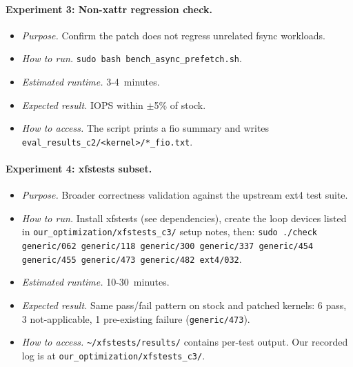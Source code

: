 \documentclass[11pt,a4paper]{article}
\begin{document}
\paragraph{Experiment 3: Non-xattr regression check.}
\begin{itemize}[leftmargin=*]
  \item \textit{Purpose.} Confirm the patch does not regress
        unrelated fsync workloads.
  \item \textit{How to run.}
        \texttt{sudo bash bench\_async\_prefetch.sh}.
  \item \textit{Estimated runtime.} 3-4~minutes.
  \item \textit{Expected result.} IOPS within $\pm$5\% of stock.
  \item \textit{How to access.} The script prints a fio summary
        and writes \texttt{eval\_results\_c2/<kernel>/*\_fio.txt}.
\end{itemize}

\paragraph{Experiment 4: xfstests subset.}
\begin{itemize}[leftmargin=*]
  \item \textit{Purpose.} Broader correctness validation against
        the upstream ext4 test suite.
  \item \textit{How to run.} Install xfstests (see dependencies),
        create the loop devices listed in
        \texttt{our\_optimization/xfstests\_c3/} setup notes, then:
        \texttt{sudo ./check generic/062 generic/118 generic/300
        generic/337 generic/454 generic/455 generic/473
        generic/482 ext4/032}.
  \item \textit{Estimated runtime.} 10-30~minutes.
  \item \textit{Expected result.} Same pass/fail pattern on stock
        and patched kernels: 6 pass, 3 not-applicable, 1
        pre-existing failure (\texttt{generic/473}).
  \item \textit{How to access.} \texttt{\textasciitilde/xfstests/results/}
        contains per-test output. Our recorded log is at
        \texttt{our\_optimization/xfstests\_c3/}.
\end{itemize}
\end{document}
